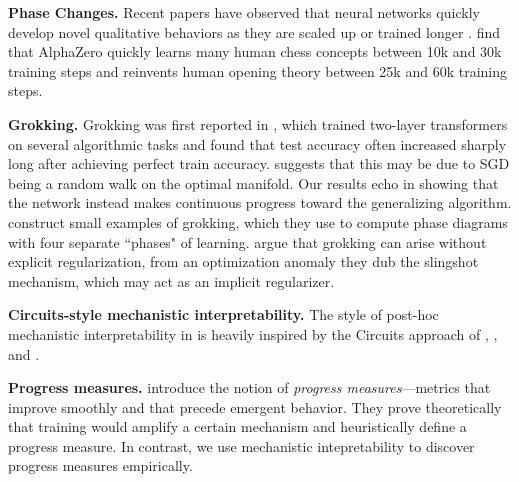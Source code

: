 \documentclass{article} %
\begin{document}
\textbf{Phase Changes.} Recent papers have observed that neural networks quickly develop novel qualitative behaviors as they are scaled up or trained longer \citep{ganguli2022predictability,wei2022emergent}. %
\citet{mcgrath2021acquisition} find that AlphaZero quickly learns many human chess concepts between 10k and 30k training steps and reinvents human opening theory between 25k and 60k training steps.

\textbf{Grokking.}
Grokking was first reported in \citet{power2022grokking}, which trained two-layer transformers on several algorithmic tasks and found that test accuracy often increased sharply long after achieving perfect train accuracy. \citet{millidge2022grokking} suggests that this may be due to SGD being a random walk on the optimal manifold. Our results echo \citet{barak2022hidden} in showing that the network instead makes continuous progress toward the generalizing algorithm. \citet{liu2022towards} construct small examples of grokking, which they use to compute phase diagrams with four separate ``phases" of learning. %
\citet{thilak2022slingshot} argue that grokking can arise without explicit regularization, from an optimization anomaly they dub the slingshot mechanism, which may act as an implicit regularizer. %

\textbf{Circuits-style mechanistic interpretability.} The style of post-hoc mechanistic interpretability in  is heavily inspired by the Circuits approach of \citet{cammarata2020thread}, \citet{elhage2021mathematical}, and \citet{olsson2022context}. %

\textbf{Progress measures.} \citet{barak2022hidden} introduce the notion of \emph{progress measures}---metrics that improve smoothly and that precede emergent behavior.  They prove theoretically that training would amplify a certain mechanism  and heuristically define a progress measure. In contrast, we use mechanistic intepretability to discover progress measures empirically. 
\end{document}
